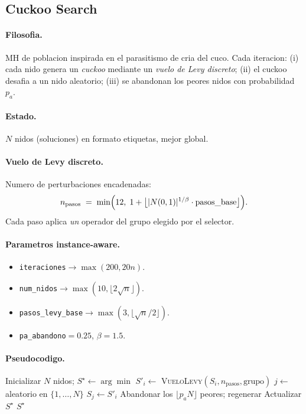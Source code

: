 \documentclass[11pt,a4paper]{article}
\newcommand{\mh}{MH}
\newcommand{\code}[1]{\texttt{#1}}
\begin{document}
\subsection{Cuckoo Search}\label{sec:cuckoo}

\paragraph{Filosofia.} \mh{} de poblacion inspirada en el parasitismo
de cria del cuco. Cada iteracion: (i) cada nido genera un
\emph{cuckoo} mediante un \emph{vuelo de Levy discreto}; (ii) el
cuckoo desafia a un nido aleatorio; (iii) se abandonan los peores
nidos con probabilidad $p_a$.

\paragraph{Estado.} $N$ nidos (soluciones) en formato etiquetas,
mejor global.

\paragraph{Vuelo de Levy discreto.} Numero de perturbaciones
encadenadas:
\begin{equation}
n_{\text{pasos}} \;=\; \min\Bigl(12,\; 1 + \bigl\lfloor |N(0,1)|^{1/\beta}\cdot
\text{pasos\_base}\bigr\rfloor\Bigr).
\end{equation}
Cada paso aplica \emph{un} operador del grupo elegido por el selector.

\paragraph{Parametros instance-aware.}
\begin{itemize}
\item \code{iteraciones}$\to \max(200, 20n)$.
\item \code{num\_nidos}$\to \max(10, \lfloor 2\sqrt{n}\rfloor)$.
\item \code{pasos\_levy\_base}$\to \max(3, \lfloor \sqrt{n}/2\rfloor)$.
\item \code{pa\_abandono}$=0.25$, $\beta=1.5$.
\end{itemize}

\paragraph{Pseudocodigo.}
\begin{algorithm}[H]
\caption{Cuckoo Search}
\begin{algorithmic}[1]
\State Inicializar $N$ nidos; $S^\star\gets\arg\min$
    \State $S'_i \gets$ \textsc{VueloLevy}$(S_i, n_\text{pasos}, \text{grupo})$
    \State $j \gets$ aleatorio en $\{1,\dots,N\}$
     $S_j \gets S'_i$ \EndIf
  \EndFor
  \State Abandonar los $\lfloor p_a N\rfloor$ peores; regenerar
  \State Actualizar $S^\star$
\EndFor
\State \Return $S^\star$
\end{algorithmic}
\end{algorithm}
\end{document}
